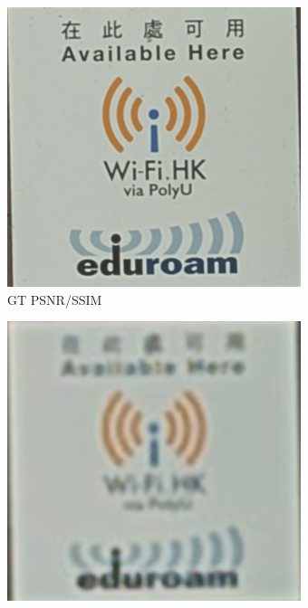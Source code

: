 \begin{figure}[htbp]
    \captionsetup[subfigure]{labelformat=empty} 
    \begin{subfigure}{0.3\textwidth}
        \includegraphics[width=\linewidth]{imgs/GT_Canon_001.png}
        \caption{GT PSNR/SSIM} 
    \end{subfigure}
    \hfill
    \begin{subfigure}{0.3\textwidth}
        \includegraphics[width=\linewidth]{imgs/STESRGAN_23.56_0.7960_Canon_001.png}

\end{subfigure}
\end{figure}
